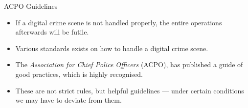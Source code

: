 \documentclass[handout]{beamer}
\begin{document}
\begin{frame}{ACPO Guidelines}

\begin{itemize}
\footnotesize

\item If a digital crime scene is not handled properly, the entire operations afterwards will be futile.
\vspace{10pt}

\item Various standards exists on how to handle a digital crime scene.
\vspace{10pt}

\item The \emph{Association for Chief Police Officers} (ACPO), has published a guide of good practices, which is highly recognised.
\vspace{10pt}

\item These are not strict rules, but helpful guidelines --- under certain conditions we may have to deviate from them.

\end{itemize}

\end{frame}
\end{document}
